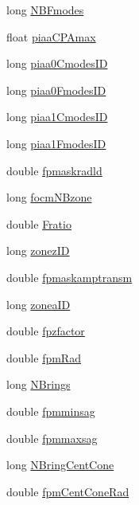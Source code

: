 \begin{DoxyCompactItemize}
long \hyperlink{structOPTPIAACMCDESIGN_ac46c632c680659b8c588701a497dbb4b}{N\+B\+Fmodes}
\item 
float \hyperlink{structOPTPIAACMCDESIGN_a3fa5fbe424c220ac11e527ae5081e2c7}{piaa\+C\+P\+Amax}
\item 
long \hyperlink{structOPTPIAACMCDESIGN_a9b381fe9d31e74c5306577c8ca59116b}{piaa0\+Cmodes\+I\+D}
\item 
long \hyperlink{structOPTPIAACMCDESIGN_a9101237f5e1b7af8a40014685cb399b9}{piaa0\+Fmodes\+I\+D}
\item 
long \hyperlink{structOPTPIAACMCDESIGN_aa59c49ac1d770c1ee0e3bce22e4d5863}{piaa1\+Cmodes\+I\+D}
\item 
long \hyperlink{structOPTPIAACMCDESIGN_a5fa43c209dc396f65f2d74d3bb275e75}{piaa1\+Fmodes\+I\+D}
\item 
double \hyperlink{structOPTPIAACMCDESIGN_ad6c571d51ab93c62406a1485713652c1}{fpmaskradld}
\item 
long \hyperlink{structOPTPIAACMCDESIGN_af885127a147736127de2d00f0872f7d3}{focm\+N\+Bzone}
\item 
double \hyperlink{structOPTPIAACMCDESIGN_a8395925e8cc76395b3f4efa8132c290c}{Fratio}
\item 
long \hyperlink{structOPTPIAACMCDESIGN_a46c2ef78ec06d39b947a793d0a03dc28}{zonez\+I\+D}
\item 
double \hyperlink{structOPTPIAACMCDESIGN_a263a0425fe40eda25832b7490b8b0391}{fpmaskamptransm}
\item 
long \hyperlink{structOPTPIAACMCDESIGN_afdfb76344ee9a82f3a5790fcb602ade6}{zonea\+I\+D}
\item 
double \hyperlink{structOPTPIAACMCDESIGN_a96c58c0598cb36779f027aaadb62073d}{fpzfactor}
\item 
double \hyperlink{structOPTPIAACMCDESIGN_aa1794c4a0929583574e315a064a1c538}{fpm\+Rad}
\item 
long \hyperlink{structOPTPIAACMCDESIGN_ac59ca64b62c48d2b6717d31114dcbf71}{N\+Brings}
\item 
double \hyperlink{structOPTPIAACMCDESIGN_abd8c35ecd940017543133dd855b1ffe3}{fpmminsag}
\item 
double \hyperlink{structOPTPIAACMCDESIGN_a5fd5d4ca057083ad662b5abac47d5140}{fpmmaxsag}
\item 
long \hyperlink{structOPTPIAACMCDESIGN_a501fee866e60cc90794c6d4fcfd3bc3a}{N\+Bring\+Cent\+Cone}
\item 
double \hyperlink{structOPTPIAACMCDESIGN_a493c4bf7d5a9348fb6331bb2f41adacb}{fpm\+Cent\+Cone\+Rad}
\item 

\end{DoxyCompactItemize}
